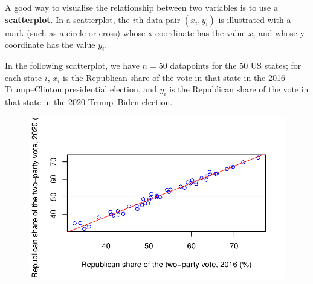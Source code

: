 \documentclass[
  letterpaper,
]{report}
\newenvironment{Shaded}{\begin{snugshade}}{\end{snugshade}}
\newcommand{\AttributeTok}[1]{\textcolor[rgb]{0.40,0.45,0.13}{#1}}
\newcommand{\DecValTok}[1]{\textcolor[rgb]{0.68,0.00,0.00}{#1}}
\newcommand{\FloatTok}[1]{\textcolor[rgb]{0.68,0.00,0.00}{#1}}
\newcommand{\FunctionTok}[1]{\textcolor[rgb]{0.28,0.35,0.67}{#1}}
\newcommand{\NormalTok}[1]{\textcolor[rgb]{0.00,0.23,0.31}{#1}}
\newcommand{\OtherTok}[1]{\textcolor[rgb]{0.00,0.23,0.31}{#1}}
\newcommand{\SpecialCharTok}[1]{\textcolor[rgb]{0.37,0.37,0.37}{#1}}
\newcommand{\StringTok}[1]{\textcolor[rgb]{0.13,0.47,0.30}{#1}}
\theoremstyle{definition}
\theoremstyle{definition}
\theoremstyle{remark}
\begin{document}
A good way to visualise the relationship between two variables is to use
a \textbf{scatterplot}. In a scatterplot, the \(i\)th data pair
\((x_i, y_i)\) is illustrated with a mark (such as a circle or cross)
whose x-coordinate has the value \(x_i\) and whose y-coordinate has the
value \(y_i\).

In the following scatterplot, we have \(n = 50\) datapoints for the 50
US states; for each state \(i\), \(x_i\) is the Republican share of the
vote in that state in the 2016 Trump--Clinton presidential election, and
\(y_i\) is the Republican share of the vote in that state in the 2020
Trump--Biden election.

\begin{Shaded}
\end{Shaded}

\begin{figure}[H]

{\centering \includegraphics{sections/L02-dataviz_files/figure-pdf/elections-1.pdf}

}

\end{figure}
\end{document}
